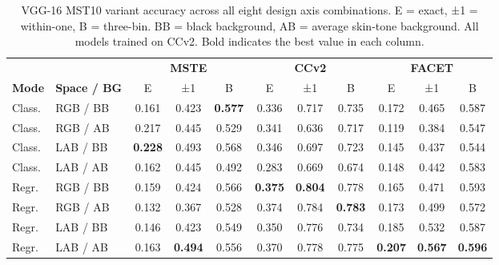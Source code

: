 \begin{table}[htbp]
	\centering
	\caption{VGG-16 MST10 variant accuracy across all eight design axis combinations. E = exact, ±1 = within-one, B = three-bin. BB = black background, AB = average skin-tone background. All models trained on CCv2. Bold indicates the best value in each column.}
	\label{tab:vgg16_mst10}
	\small
	\begin{tabular}{llccccccccc}
		\toprule
		& & \multicolumn{3}{c}{\textbf{MSTE}} & \multicolumn{3}{c}{\textbf{CCv2}} & \multicolumn{3}{c}{\textbf{FACET}} \\
		\cmidrule(lr){3-5} \cmidrule(lr){6-8} \cmidrule(lr){9-11}
		\textbf{Mode} & \textbf{Space / BG} & E & ±1 & B & E & ±1 & B & E & ±1 & B \\
		\midrule
		Class. & RGB / BB & 0.161 & 0.423 & \textbf{0.577} & 0.336 & 0.717 & 0.735 & 0.172 & 0.465 & 0.587 \\
		Class. & RGB / AB & 0.217 & 0.445 & 0.529 & 0.341 & 0.636 & 0.717 & 0.119 & 0.384 & 0.547 \\
		Class. & LAB / BB & \textbf{0.228} & 0.493 & 0.568 & 0.346 & 0.697 & 0.723 & 0.145 & 0.437 & 0.544 \\
		Class. & LAB / AB & 0.162 & 0.445 & 0.492 & 0.283 & 0.669 & 0.674 & 0.148 & 0.442 & 0.583 \\
		Regr.  & RGB / BB & 0.159 & 0.424 & 0.566 & \textbf{0.375} & \textbf{0.804} & 0.778 & 0.165 & 0.471 & 0.593 \\
		Regr.  & RGB / AB & 0.132 & 0.367 & 0.528 & 0.374 & 0.784 & \textbf{0.783} & 0.173 & 0.499 & 0.572 \\
		Regr.  & LAB / BB & 0.146 & 0.423 & 0.549 & 0.350 & 0.776 & 0.734 & 0.185 & 0.532 & 0.587 \\
		Regr.  & LAB / AB & 0.163 & \textbf{0.494} & 0.556 & 0.370 & 0.778 & 0.775 & \textbf{0.207} & \textbf{0.567} & \textbf{0.596} \\
		\bottomrule
	\end{tabular}
\end{table}

